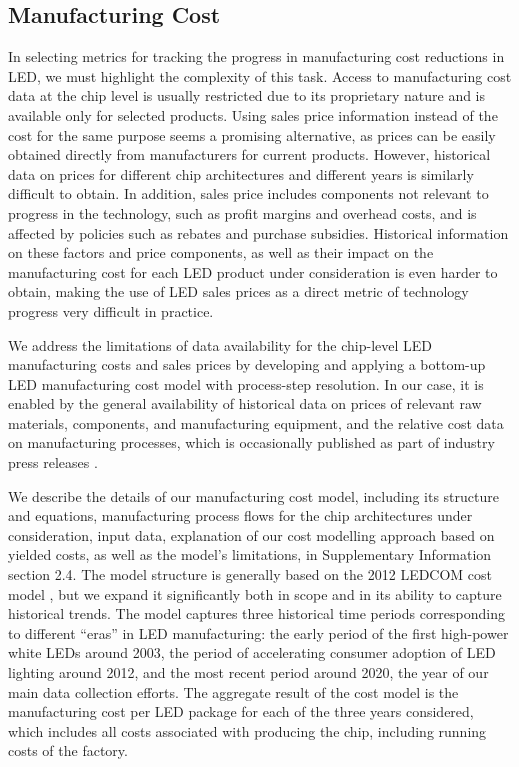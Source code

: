 \documentclass[journal=jacsat,manuscript=article]{achemso}
\begin{document}
\subsection{Manufacturing Cost}

In selecting metrics for tracking the progress in manufacturing cost reductions in LED, we must highlight the complexity of this task. Access to manufacturing cost data at the chip level is usually restricted due to its proprietary nature and is available only for selected products. Using sales price information instead of the cost for the same purpose seems a promising alternative, as prices can be easily obtained directly from manufacturers for current products. However, historical data on prices for different chip architectures and different years is similarly difficult to obtain. In addition, sales price includes components not relevant to progress in the technology, such as profit margins and overhead costs, and is affected by policies such as rebates and purchase subsidies. Historical information on these factors and price components, as well as their impact on the manufacturing cost for each LED product under consideration is even harder to obtain, making the use of LED sales prices as a direct metric of technology progress very difficult in practice. 

We address the limitations of data availability for the chip-level LED manufacturing costs and sales prices by developing and applying a bottom-up LED manufacturing cost model with process-step resolution. In our case, it is enabled by the general availability of historical data on prices of relevant raw materials, components, and manufacturing equipment, and the relative cost data on manufacturing processes, which is occasionally published as part of industry press releases \cite{ledinside2013csp}\cite{seoul2015csp}. 

We describe the details of our manufacturing cost model, including its structure and equations, manufacturing process flows for the chip architectures under consideration, input data, explanation of our cost modelling approach based on yielded costs, as well as the model's limitations, in Supplementary Information section 2.4. The model structure is generally based on the 2012 LEDCOM cost model \cite{ledcomv2}, but we expand it significantly both in scope and in its ability to capture historical trends. The model captures three historical time periods corresponding to different “eras” in LED manufacturing: the early period of the first high-power white LEDs around 2003, the period of accelerating consumer adoption of LED lighting around 2012, and the most recent period around 2020, the year of our main data collection efforts. The aggregate result of the cost model is the manufacturing cost per LED package for each of the three years considered, which includes all costs associated with producing the chip, including running costs of the factory.
\end{document}
